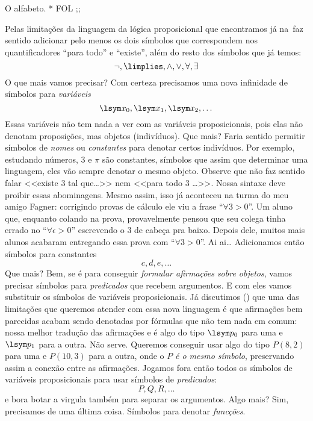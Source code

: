 \note O alfabeto.
    * FOL
    ;;

Pelas limitações da linguagem da lógica proposicional que encontramos
já na~ faz sentido adicionar pelo menos os dois
símbolos que correspondem nos quantificadores ``para todo'' e ``existe'',
além do resto dos símbolos que já temos:
$$
\lnot, \limplies, \land, \lor, \forall, \exists
$$
\eop
O que mais vamos precisar?
Com certeza precisamos uma nova infinidade de símbolos para \emph{variáveis}
$$
\lsym x_0, \lsym x_1, \lsym x_2, \dots
$$
Essas variáveis não tem nada a ver com as variáveis proposicionais,
pois elas não denotam proposições, mas objetos (indivíduos).
\eop
Que mais?
Faria sentido permitir símbolos de \emph{nomes} ou \emph{constantes}
para denotar certos indivíduos.  Por exemplo, estudando números,
$3$ e $\pi$ são constantes, símbolos que assim que determinar uma
linguagem, eles vão sempre denotar o mesmo objeto.
Observe que não faz sentido falar <<existe $3$ tal que\dots>>
nem <<para todo $3$ \dots>>.  Nossa sintaxe deve proibir essas
abominagens.\foot
Mesmo assim, isso já aconteceu na turma do meu amigo Fagner:
corrigindo provas de cálculo ele viu a frase ``$\forall 3 > 0$''.
Um aluno que, enquanto colando na prova, provavelmente pensou
que seu colega tinha errado no ``$\forall \epsilon > 0$'' escrevendo
o $3$ de cabeça pra baixo.
Depois dele, muitos mais alunos acabaram entregando essa prova com
``$\forall 3 > 0$''.  Ai ai\dots
\toof
Adicionamos então símbolos para constantes
$$
c,d,e,\dots
$$
\eop
Que mais?
Bem, se é para conseguir \emph{formular afirmações sobre objetos},
vamos precisar símbolos para \emph{predicados} que recebem argumentos.
E com eles vamos substituir os símbolos de variáveis proposicionais.
Já discutimos () que uma das limitações que
queremos atender com essa nova linguagem é que afirmações bem parecidas
acabam sendo denotadas por fórmulas que não tem nada em comum:
nossa melhor tradução das afirmações 
e  é algo do tipo $\lsym p_0$ para uma e
$\lsym p_1$ para a outra.
Não serve.  Queremos conseguir usar algo do tipo $P(8,2)$ para uma
e $P(10,3)$ para a outra, onde o $P$ \emph{é o mesmo símbolo},
preservando assim a conexão entre as afirmações.
Jogamos fora então todos os símbolos de variáveis proposicionais
para usar símbolos de \emph{predicados}:
$$
P, Q, R, \dots
$$
e bora botar a virgula \symq{$,$} também para separar os argumentos.
\eop
Algo mais?
Sim, precisamos de uma última coisa.
Símbolos para denotar \emph{funcções}.

